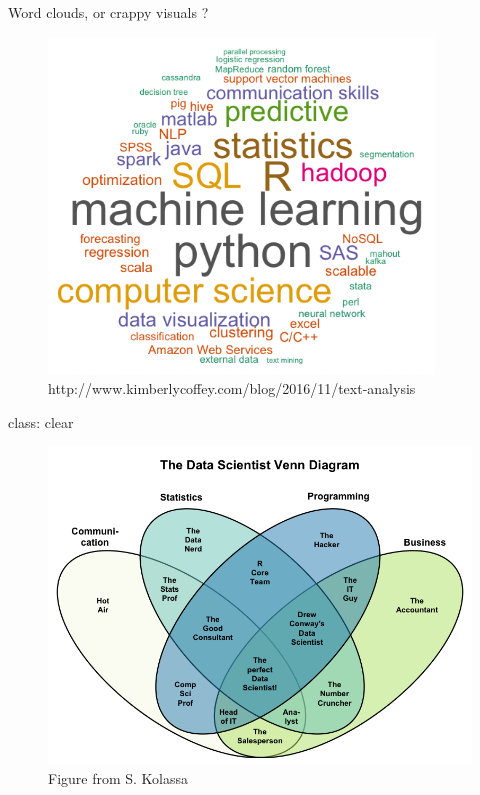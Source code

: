 \documentclass[
  ignorenonframetext,
]{beamer}
\begin{document}
\begin{frame}{Word clouds, or crappy visuals ?}
\protect\hypertarget{word-clouds-or-crappy-visuals}{}
\begin{figure}

{\centering \includegraphics[width=0.7\linewidth]{figures/word_cloud_skills} 

}

\caption{http://www.kimberlycoffey.com/blog/2016/11/text-analysis}\label{fig:unnamed-chunk-10}
\end{figure}

class: clear

\begin{figure}

{\centering \includegraphics[width=0.8\linewidth]{figures/Venn} 

}

\caption{Figure from S. Kolassa}\label{fig:unnamed-chunk-13}
\end{figure}
\end{frame}
\end{document}
